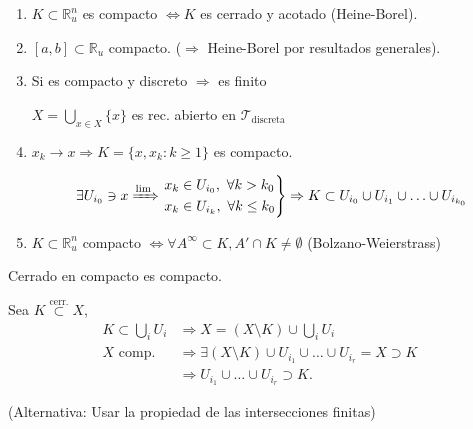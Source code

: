 \begin{ej}
\begin{enumerate}
    \item $K \subset \mathbb{R}_u^n$ es compacto $\Leftrightarrow K$ es cerrado y acotado (Heine-Borel). 
    \item $\left[ a, b \right] \subset \mathbb{R}_u$ compacto. ($\Rightarrow$ Heine-Borel por resultados generales).
    \item Si es compacto y discreto $\Rightarrow$ es finito 
    \begin{demo}
        $X = \bigcup_{x \in X} \{x\}$ es rec. abierto en $\mathcal{T}_{\text{discreta}}$ 
    \end{demo}
    \item $x_k \rightarrow x \Rightarrow K = \{x, x_k: k \ge 1\}$ es compacto.
    \begin{demo}
        \[
            \exists U_{i_0} \ni x \xRightarrow{\lim} \begin{rcases}
                x_k \in U_{i_0},\ \forall k > k_0\\
                x_k \in U_{i_k},\ \forall k \le k_0
            \end{rcases} \Rightarrow K \subset U_{i_0} \cup U_{i_1} \cup \ldots \cup U_{i_{k_0}} 
        \]
    \end{demo}

    \item $K \subset \mathbb{R}_u^n$ compacto $\Leftrightarrow \forall A^{\infty} \subset K, A' \cap K \neq \emptyset$ (Bolzano-Weierstrass)
\end{enumerate}
\end{ej}

\begin{prop}[Mantra 1]
Cerrado en compacto es compacto. 
\end{prop}
\begin{demo}
Sea $K \stackrel{\text{cerr.}}{\subset} X$,
\begin{align*}
    K \subset \bigcup_{i} U_i &\Rightarrow X = \left( X \setminus K \right) \cup \bigcup_{i} U_i\\
    X \text{ comp.} &\Rightarrow \exists \left( X \setminus K \right) \cup U_{i_1} \cup \ldots \cup U_{i_r} = X \supset K\\
    &\Rightarrow U_{i_1} \cup \ldots \cup U_{i_r} \supset K
.\end{align*}

(Alternativa: Usar la propiedad de las intersecciones finitas)
\end{demo}

